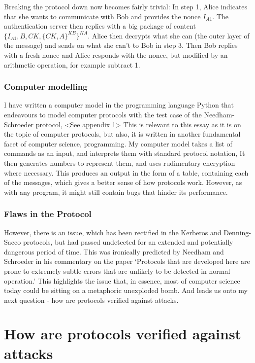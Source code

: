\documentclass{article}
\begin{document}
Breaking the protocol down now becomes fairly trivial: In step 1, Alice
indicates that she wants to communicate with Bob and provides the nonce
$I_{A1}$. The authentication server then replies with a big package of content
$\{ I_{A1}, B, CK, \{CK, A\}^{KB} \}^{KA}$. Alice then decrypts what she can
(the outer layer of the message) and sends on what she can’t to Bob in step 3.
Then Bob replies with a fresh nonce and Alice responds with the nonce, but
modified by an arithmetic operation, for example subtract 1.


\subsubsection{Computer modelling}
I have written a computer model in the programming language Python  that
endeavours to model computer protocols with the test case of the
Needham-Schroeder protocol, <See appendix 1> This is relevant to this essay
as it is on the topic of computer protocols, but also, it is written in another
fundamental facet of computer science, programming. My computer model takes a
list of commands as an input, and interprets them with standard protocol
notation, It then generates numbers to represent them, and uses rudimentary
encryption where necessary. This produces an output in the form of a table,
containing each of the messages, which gives a better sense of how protocols
work. However, as with any program, it might still contain bugs that hinder its
performance.

\subsubsection{Flaws in the Protocol}
However, there is an issue, which has been rectified in the Kerberos and
Denning-Sacco protocols, but had passed undetected for an extended and
potentially dangerous period of time. This was ironically predicted by Needham
and Schroeder in his commentary on the paper ‘Protocols that are developed here
are prone to extremely subtle errors that are unlikely to be detected in normal
operation.’ This highlights the issue that, in essence, most of computer science
today could be sitting on a metaphoric unexploded bomb. And leads us onto my
next question - how are protocols verified against attacks.

\section{How are protocols verified against attacks}
\end{document}
